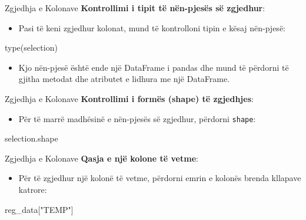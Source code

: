 \documentclass[
  ignorenonframetext,
]{beamer}
\newenvironment{Shaded}{\begin{snugshade}}{\end{snugshade}}
\newcommand{\BuiltInTok}[1]{#1}
\newcommand{\NormalTok}[1]{#1}
\newcommand{\StringTok}[1]{\textcolor[rgb]{0.31,0.60,0.02}{#1}}
\providecommand{\tightlist}{%
  \setlength{\itemsep}{0pt}\setlength{\parskip}{0pt}}
\begin{document}
\begin{frame}[fragile]{Zgjedhja e Kolonave}
\protect\hypertarget{zgjedhja-e-kolonave-1}{}
\textbf{Kontrollimi i tipit të nën-pjesës së zgjedhur}:

\begin{itemize}
\tightlist
\item
  Pasi të keni zgjedhur kolonat, mund të kontrolloni tipin e kësaj
  nën-pjesë:
\end{itemize}

\begin{Shaded}
\begin{Highlighting}[]
    \BuiltInTok{type}\NormalTok{(selection)}
\end{Highlighting}
\end{Shaded}

\begin{itemize}
\tightlist
\item
  Kjo nën-pjesë është ende një DataFrame i pandas dhe mund të përdorni
  të gjitha metodat dhe atributet e lidhura me një DataFrame.
\end{itemize}
\end{frame}

\begin{frame}[fragile]{Zgjedhja e Kolonave}
\protect\hypertarget{zgjedhja-e-kolonave-2}{}
\textbf{Kontrollimi i formës (shape) të zgjedhjes}:

\begin{itemize}
\tightlist
\item
  Për të marrë madhësinë e nën-pjesës së zgjedhur, përdorni
  \texttt{shape}:
\end{itemize}

\begin{Shaded}
\begin{Highlighting}[]
\NormalTok{    selection.shape}
\end{Highlighting}
\end{Shaded}
\end{frame}

\begin{frame}[fragile]{Zgjedhja e Kolonave}
\protect\hypertarget{zgjedhja-e-kolonave-3}{}
\textbf{Qasja e një kolone të vetme}:

\begin{itemize}
\tightlist
\item
  Për të zgjedhur një kolonë të vetme, përdorni emrin e kolonës brenda
  kllapave katrore:
\end{itemize}

\begin{Shaded}
\begin{Highlighting}[]
\NormalTok{    reg\_data[}\StringTok{"TEMP"}\NormalTok{]}
\end{Highlighting}
\end{Shaded}
\end{frame}
\end{document}
